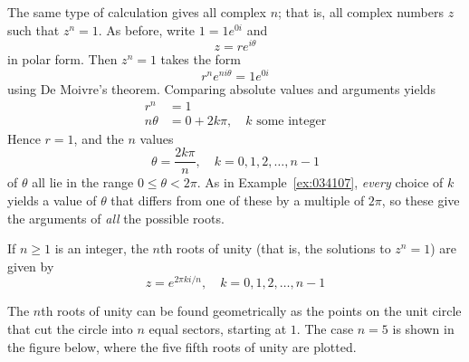 \documentclass{ximera}
\begin{document}
The same type of calculation gives all complex $n$; that is, all complex numbers $z$ such that $z^n = 1$. As before, write $1 = 1e^{0i}$ and
\begin{equation*}
z = re^{i\theta}
\end{equation*}
in polar form. Then $z^n = 1$ takes the form
\begin{equation*}
r^ne^{ni\theta} = 1e^{0i}
\end{equation*}
using De Moivre's theorem. Comparing absolute values and arguments yields
\begin{align*}
r^n &= 1 \\
n\theta & = 0 + 2k\pi, \quad k \mbox{ some integer}
\end{align*}
Hence $r = 1$, and the $n$ values
\begin{equation*}
\theta = \frac{2k\pi}{n}, \quad k=0, 1, 2, \dots, n-1
\end{equation*}
of $\theta$ all lie in the range $0 \leq \theta < 2\pi$. As in Example~\ref{ex:034107}, \textit{every} choice of $k$ yields a value of $\theta$ that differs from one of these by a multiple of $2\pi$, so these give the arguments of \textit{all} the possible roots.


\begin{theorem}\label{th:034138}
If $n \geq 1$ is an integer, the $n$th roots of unity (that is, the solutions to $z^n = 1$) are given by
\begin{equation*}
z = e^{2\pi ki/n}, \quad k = 0, 1, 2, \dots, n-1
\end{equation*}
\end{theorem}

The $n$th roots of unity can be found geometrically as the points on the unit circle that cut the circle into $n$ equal sectors, starting at $1$. The case $n = 5$ is shown in the figure below, where the five fifth roots of unity are plotted.

\begin{center}
\end{center}
\end{document}

